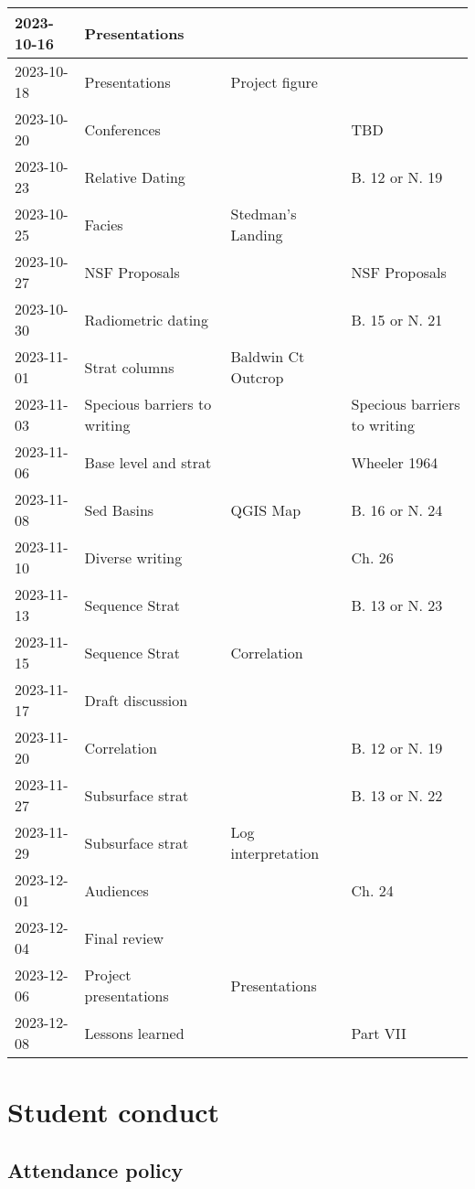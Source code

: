 \documentclass[11pt,]{article}
\begin{document}
\begin{table}
\begin{tabular}[t]{l|>{\raggedright\arraybackslash}p{5cm}|>{\raggedright\arraybackslash}p{5cm}|>{\raggedright\arraybackslash}p{5cm}}
\hline
2023-10-16 & Presentations &  & \\
\hline
2023-10-18 & Presentations & Project figure & \\
\hline
2023-10-20 & Conferences &  & TBD\\
\hline
2023-10-23 & Relative Dating &  & B. 12 or N. 19\\
\hline
2023-10-25 & Facies & Stedman's Landing & \\
\hline
2023-10-27 & NSF Proposals &  & NSF Proposals\\
\hline
2023-10-30 & Radiometric dating &  & B. 15 or N. 21\\
\hline
2023-11-01 & Strat columns & Baldwin Ct Outcrop & \\
\hline
2023-11-03 & Specious barriers to writing &  & Specious barriers to writing\\
\hline
2023-11-06 & Base level and strat &  & Wheeler 1964\\
\hline
2023-11-08 & Sed Basins & QGIS Map & B. 16 or N. 24\\
\hline
2023-11-10 & Diverse writing &  & Ch. 26\\
\hline
2023-11-13 & Sequence Strat &  & B. 13 or N. 23\\
\hline
2023-11-15 & Sequence Strat & Correlation & \\
\hline
2023-11-17 & Draft discussion &  & \\
\hline
2023-11-20 & Correlation &  & B. 12 or N. 19\\
\hline
2023-11-27 & Subsurface strat &  & B. 13 or N. 22\\
\hline
2023-11-29 & Subsurface strat & Log interpretation & \\
\hline
2023-12-01 & Audiences &  & Ch. 24\\
\hline
2023-12-04 & Final review &  & \\
\hline
2023-12-06 & Project presentations & Presentations & \\
\hline
2023-12-08 & Lessons learned &  & Part VII\\
\hline
\end{tabular}
\end{table}

\newpage

\hypertarget{student-conduct}{%
\section{Student conduct}\label{student-conduct}}

\hypertarget{attendance-policy}{%
\subsection{Attendance policy}\label{attendance-policy}}
\end{document}
